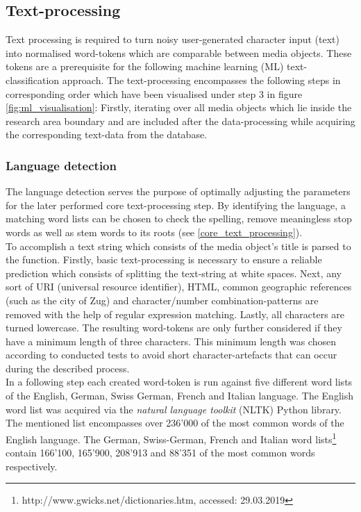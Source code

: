 \subsection{Text-processing} \label{text_processing}
Text processing is required to turn noisy user-generated character input (text) into normalised word-tokens which are comparable between media objects. These tokens are a prerequisite for the following machine learning (ML) text-classification approach. The text-processing encompasses the following steps in corresponding order which have been visualised under step 3 in figure \ref{fig:ml_visualisation}: Firstly, iterating over all media objects which lie inside the research area boundary and are included after the data-processing while acquiring the corresponding text-data from the database.

\subsubsection*{Language detection} \label{language_detection}
The language detection serves the purpose of optimally adjusting the parameters for the later performed core text-processing step. By identifying the language, a matching word lists can be chosen to check the spelling, remove meaningless stop words as well as stem words to its roots (see \ref{core_text_processing}).\\
To accomplish a text string which consists of the media object's title is parsed to the function. Firstly, basic text-processing is necessary to ensure a reliable prediction which consists of splitting the text-string at white spaces. Next, any sort of URI (universal resource identifier), HTML, common geographic references (such as the city of Zug) and character/number combination-patterns are removed with the help of regular expression matching. Lastly, all characters are turned lowercase. The resulting word-tokens are only further considered if they have a minimum length of three characters. This minimum length was chosen according to conducted tests to avoid short character-artefacts that can occur during the described process.\\
In a following step each created word-token is run against five different word lists of the English, German, Swiss German, French and Italian language.
The English word list was acquired via the \textit{natural language toolkit} (NLTK) Python library. The mentioned list encompasses over 236'000 of the most common words of the English language.
The German, Swiss-German, French and Italian word lists\footnote{http://www.gwicks.net/dictionaries.htm, accessed: 29.03.2019} contain 166'100, 165'900, 208'913 and 88'351 of the most common words respectively.\\

